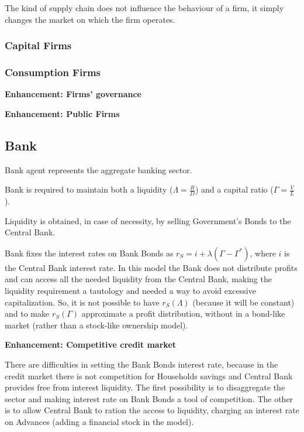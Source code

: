 \documentclass[a4paper, headings=standardclasses]{scrartcl}
\newenvironment{enh}[1][]{\begin{framed}\noindent\textbf{Enhancement: #1}\par}{\end{framed}}
\begin{document}
The kind of supply chain does not influence the behaviour of a firm, it simply changes the market on which the firm operates.

\subsubsection{Capital Firms}

\subsubsection{Consumption Firms}

\begin{enh}[Firms' governance]

\end{enh}

\begin{enh}[Public Firms]
\end{enh}


\subsection{Bank}
Bank agent represents the aggregate banking sector.

Bank is required to maintain both a liquidity ($\Lambda = \frac{R}{D}$) and a capital ratio ($\Gamma = \frac{V}{L}$).

Liquidity is obtained, in case of necessity, by selling Government's Bonds to the Central Bank.

Bank fixes the interest rates on Bank Bonds as $r_S = i + \lambda(\Gamma - \Gamma^*)$, where $i$ is the Central Bank interest rate. In this model the Bank does not distribute profits and can access all the needed liquidity from the Central Bank, making the liquidity requirement a tautology and needed a way to avoid excessive capitalization. So, it is not possible to have $r_S(\Lambda)$ (because it will be constant) and to make $r_S(\Gamma)$ approximate a profit distribution, without in a bond-like market (rather than a stock-like ownership model).

\begin{enh}[Competitive credit market]
	There are difficulties in setting the Bank Bonds interest rate, because in the credit market there is not competition for Households savings and Central Bank provides free from interest liquidity.
	The first possibility is to disaggregate the sector and making interest rate on Bank Bonds a tool of competition.
	The other is to allow Central Bank to ration the access to liquidity, charging an interest rate on Advances (adding a financial stock in the model).
\end{enh}
\end{document}
